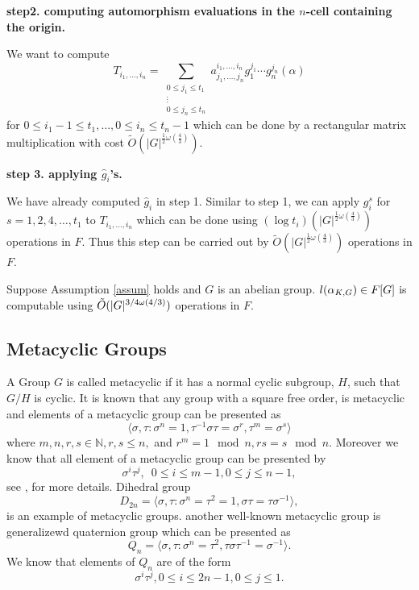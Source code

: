\textbf{step2. computing automorphism evaluations in the $n$-cell containing the origin.}

We want to compute
$$T_{i_1, \ldots, i_n} = \sum_{\substack{0 \leq j_1 \leq t_1\\ \vdots \\ 0 \leq j_n \leq t_n}} a^{i_1, \ldots , i_n}_{j_1, \ldots , j_n}g_1^{j_1}\cdots g_n^{j_n}(\alpha)$$
for $0 \leq i_1-1 \leq t_1, \ldots , 0 \leq i_n \leq t_n-1$ which can be done by a rectangular matrix multiplication with cost
$\tilde{O}(\vert G \vert ^{\frac{1}{2}\omega(\frac{4}{3})})$.

\textbf{step 3. applying $\hat{g}_i$'s.}

We have already computed $\hat{g}_i$ in step 1. Similar to step 1, we can apply $g_i^s$ 
for $s = 1, 2, 4 , \ldots, t_1$ to $T_{i_1, \ldots , i_n}$ which can be done using $(\log t_i)(\vert G \vert^{\frac{1}{2}\omega
(\frac{4}{3})})$ operations in $F$. Thus this step can be carried out by $\tilde{O}(\vert G \vert^{\frac{1}{2}\omega
(\frac{4}{3})})$ operations in $F$. 

\begin{proposition}
Suppose Assumption \ref{assum} holds and $G$ is an abelian group. $l(\alpha_{K,G}) \in F[G]$ is computable using $\tilde{O}(\vert G \vert ^{3/4 \omega(4/3)})$ 
operations in $F$.
\end{proposition}

\subsection{Metacyclic Groups}

A Group $G$ is called metacyclic if it has a normal cyclic subgroup, $H$, such that $G/H$ is cyclic. It is known that any group
with a square free order, is metacyclic and elements of a metacyclic group can be presented as 
\begin{equation}\label{eq:metacyclic}
\langle \sigma,\tau: \sigma^n = 1, \tau^{-1}\sigma \tau = \sigma^r, \tau ^m = \sigma^s \rangle
\end{equation}
where $m,n,r,s \in \mathbb{N}, r,s \leq n,$ and $r^m = 1 \mod n , rs = s \mod n$. Moreover we know that all element of a metacyclic
 group can be presented by $$\sigma^i \tau^j, \,\,\, 0\leq i \leq m-1, 0\leq j \leq n-1,$$ 
see \cite[P.88, Proposition 1]{Johnson}, \cite[P.334]{Curtis} for more details. Dihedral group 
$$D_{2n} = \langle \sigma,\tau: \sigma^n =\tau^2 = 1, \sigma \tau = \tau \sigma^{-1} \rangle, $$
is an example of metacyclic groups. another well-known metacyclic group is generalizewd quaternion
 group which can be presented as
 $$Q_n = \langle \sigma,\tau: \sigma^n =\tau^2, \tau \sigma \tau^{-1} = \sigma^{-1} \rangle.$$
 We know that elements of $Q_n$ are of the form 
 $$\sigma^i\tau^j, 0 \leq i \leq 2n-1 , 0\leq j \leq 1.$$
 
